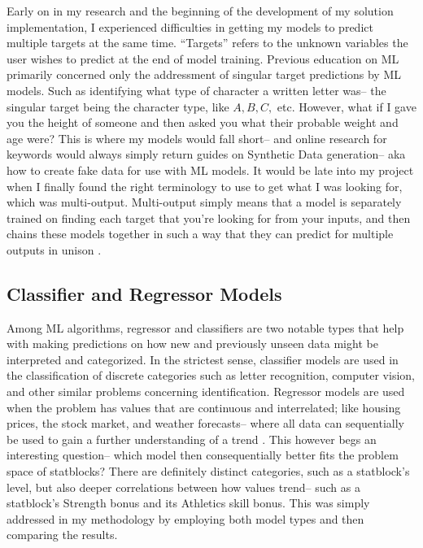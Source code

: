 \documentclass[11pt]{article}
\begin{document}
Early on in my research and the beginning of the development of my solution implementation, I experienced difficulties in getting my models to predict multiple targets at the same time. ``Targets'' refers to the unknown variables the user wishes to predict at the end of model training. Previous education on ML primarily concerned only the addressment of singular target predictions by ML models. Such as identifying what type of character a written letter was-- the singular target being the character type, like $A, B, C,$ etc. However, what if I gave you the height of someone and then asked you what their probable weight and age were? This is where my models would fall short-- and online research for keywords would always simply return guides on Synthetic Data generation-- aka how to create fake data for use with ML models. It would be late into my project when I finally found the right terminology to use to get what I was looking for, which was multi-output. Multi-output simply means that a model is separately trained on finding each target that you're looking for from your inputs, and then chains these models together in such a way that they can predict for multiple outputs in unison \cite{ngashu_2022}.

\subsection{Classifier and Regressor Models}

Among ML algorithms, regressor and classifiers are two notable types that help with making predictions on how new and previously unseen data might be interpreted and categorized. In the strictest sense, classifier models are used in the classification of discrete categories such as letter recognition, computer vision, and other similar problems concerning identification. Regressor models are used when the problem has values that are continuous and interrelated; like housing prices, the stock market, and weather forecasts-- where all data can sequentially be used to gain a further understanding of a trend \cite{javatpoint}. This however begs an interesting question-- which model then consequentially better fits the problem space of statblocks? There are definitely distinct categories, such as a statblock's level, but also deeper correlations between how values trend-- such as a statblock's Strength bonus and its Athletics skill bonus. This was simply addressed in my methodology by employing both model types and then comparing the results.
\end{document}
